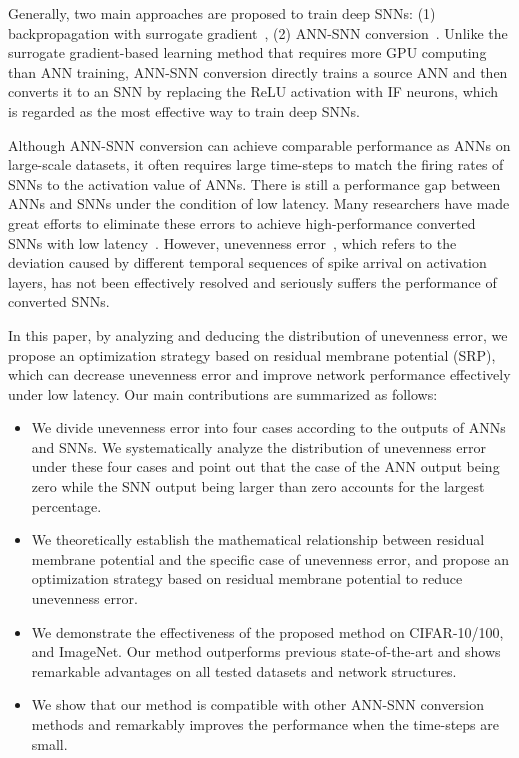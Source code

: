 \documentclass[letterpaper]{article} %
\begin{document}
Generally, two main approaches are proposed to train deep SNNs: (1) backpropagation with surrogate gradient~\cite{neftci2019surrogate,kim2020unifying}, (2) ANN-SNN conversion~\cite{cao2015spiking,rueckauer2016theory}. Unlike the surrogate gradient-based learning method that requires more GPU computing than ANN training, ANN-SNN conversion directly trains a source ANN and then converts it to an SNN by replacing the ReLU activation with IF neurons, which is regarded as the most effective way to train deep SNNs.

Although ANN-SNN conversion can achieve comparable performance as ANNs on large-scale datasets, it often requires large time-steps to match the firing rates of SNNs to the activation value of ANNs. There is still a performance gap between ANNs and SNNs under the condition of low latency. Many researchers have made great efforts to eliminate these errors to achieve high-performance converted SNNs with low latency~\cite{han2020rmp,ding2021optimal,ho2021tcl,deng2020optimal,li2021free,li2022quantization}. However, unevenness error~\cite{bu2022optimal}, which refers to the deviation caused by different temporal sequences of spike arrival on activation layers, has not been effectively resolved and seriously suffers the performance of converted SNNs.

In this paper, by analyzing and deducing the distribution of unevenness error, we propose an optimization strategy based on residual membrane potential (SRP), which can decrease unevenness error and improve network performance effectively under low latency. Our main contributions are summarized as follows:
\begin{itemize}
    \item[1] We divide unevenness error into four cases according to the outputs of ANNs and SNNs. We systematically analyze the distribution of unevenness error under these four cases and point out that the case of the ANN output being zero while the SNN output being larger than zero accounts for the largest percentage.
    \item[2] We theoretically establish the mathematical relationship between residual membrane potential and the specific case of unevenness error, and propose an optimization strategy based on residual membrane potential to reduce unevenness error.
    \item[3] We demonstrate the effectiveness of the proposed method on CIFAR-10/100, and ImageNet. Our method outperforms previous state-of-the-art and shows remarkable advantages on all tested datasets and network structures.
     \item[4] We show that our method is compatible with other ANN-SNN conversion methods and remarkably improves the performance when the time-steps are small.
\end{itemize}
\end{document}

